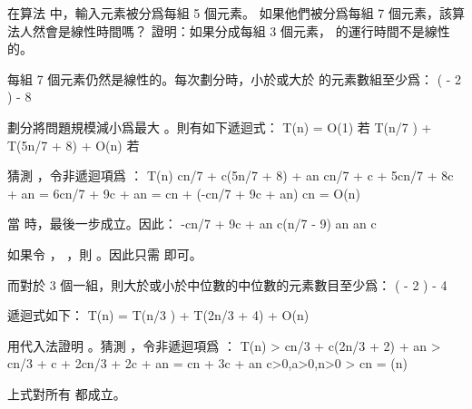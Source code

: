 \startsection[
  title={Selection in worst-case linear time},
  reference=section:worstcase_linear_selection,
]

\startEXERCISE
在算法  中，輸入元素被分爲每組 5 個元素。
如果他們被分爲每組 7 個元素，該算法人然會是線性時間嗎？
證明：如果分成每組 3 個元素，  的運行時間不是線性的。
\stopEXERCISE

\startANSWER
每組 7 個元素仍然是線性的。每次劃分時，小於或大於  的元素數組至少爲：
 \left(\left\lceil {} \left\lceil {} \right\rceil \right\rceil
           - 2 \right) \ge {} - 8
\stopformula

劃分將問題規模減小爲最大 。則有如下遞迴式：
\startformula
T(n) = \startmathcases
 \NC O(1) \NC 若  \NR
 \NC T(\left\lceil n/7 \right\rceil) + T(5n/7 + 8) + O(n) \NC 若  \NR
\stopmathcases
\stopformula

猜測 ，令非遞迴項爲 ：
\startformula\startmathalignment
\NC T(n) \NC \le c\left\lceil n/7 \right\rceil + c(5n/7 + 8) + an \NR
\NC \NC \le cn/7 + c + 5cn/7 + 8c + an \NR
\NC \NC = 6cn/7 + 9c + an \NR
\NC \NC = cn + (-cn/7 + 9c + an) \NR
\NC \NC \le cn \NR
\NC \NC = O(n) \NR
\stopmathalignment\stopformula

當  時，最後一步成立。因此：
\startformula\startmathalignment[n=1]
\NC -cn/7 + 9c + an  \NR
\NC \Downarrow \NR
\NC c(n/7 - 9) \ge an \NR
\NC \Downarrow \NR
\NC {} \ge an \NR
\NC \Downarrow \NR
\NC c \ge {} \NR
\stopmathalignment\stopformula

如果令 ， ，則 。因此只需  即可。

而對於 3 個一組，則大於或小於中位數的中位數的元素數目至少爲：
 \left(\left\lceil {} \left\lceil {} \right\rceil \right\rceil
           - 2 \right) \ge {} - 4
\stopformula

遞迴式如下：
\startformula
T(n) = T(\left\lceil n/3 \right\rceil) + T(2n/3 + 4) + O(n)
\stopformula

用代入法證明 。猜測 ，令非遞迴項爲 ：
\startformula\startmathalignment
\NC T(n) \NC > c\left\lceil n/3 \right\rceil + c(2n/3 + 2) + an \NR
\NC \NC > cn/3 + c + 2cn/3 + 2c + an \NR
\NC \NC = cn + 3c + an \qquad c>0,a>0,n>0\NR
\NC \NC > cn \NR
\NC \NC = \omega(n) \NR
\stopmathalignment\stopformula

上式對所有  都成立。
\stopANSWER

